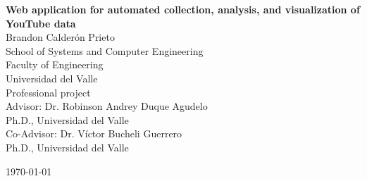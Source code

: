 \begin{titlepage}

    \centering
    {\LARGE\bfseries Web application for automated collection, analysis, and visualization of YouTube data} \\[1 cm]

    {\large Brandon Calderón Prieto} \\[1 cm]

    {\large School of Systems and Computer Engineering} \\[0.3 cm]
    {\large Faculty of Engineering} \\[0.3 cm]
    {\large Universidad del Valle} \\[3 cm]

    {\large Professional project} \\[3 cm]

    {\large Advisor: Dr. Robinson Andrey Duque Agudelo} \\[0.3 cm]
    {\normalsize Ph.D., Universidad del Valle} \\[1 cm]

    {\large Co-Advisor: Dr. Víctor Bucheli Guerrero} \\[0.3 cm]
    {\normalsize Ph.D., Universidad del Valle}

    \vfill

    {\today}
\end{titlepage}
